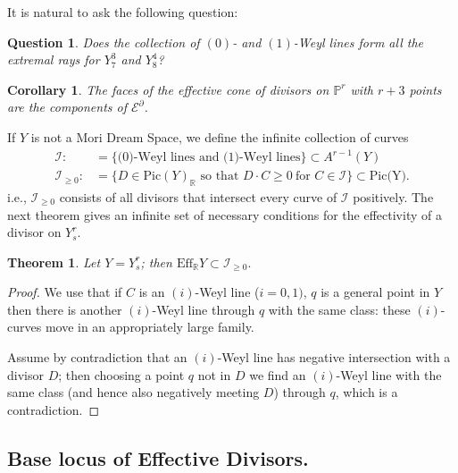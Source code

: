 \documentclass[12pt]{article}
\newtheorem{theorem}[equation]{Theorem}
\newtheorem{corollary}[equation]{Corollary}
\newtheorem{question}[equation]{Question}
\numberwithin{equation}{section}
\numberwithin{subeq}{equation}
\def\bbR{\mathbb{R}}
\begin{document}
It is natural to ask the following question:
\begin{question}\label{nms3}
Does the collection of $(0)$- and $(1)$-Weyl lines form all the extremal rays for $Y^3_7$ and $Y^4_8$?
\end{question}

\begin{corollary}
The faces of the effective cone of divisors on $\mathbb{P}^r$ with $r+3$ points are the components of $\mathcal{E}^{\partial}$.
\end{corollary}


If $Y$ is not a Mori Dream Space,
we define the infinite collection of curves
\begin{equation}
\begin{split}
\mathcal{I}:&=\{\text{(0)-Weyl lines and (1)-Weyl lines} \} \subset A^{r-1}(Y)\\
\mathcal{I}_{\geq 0}:&=\{D\in \text{Pic}(Y)_{\bbR} \text{ so that } D \cdot C\geq 0\ \text{for } C\in \mathcal{I}\} \subset \text{Pic(Y)}.
\end{split}
\end{equation}
i.e., $\mathcal{I}_{\geq 0}$ consists of
all divisors that intersect every curve of $\mathcal{I}$ positively.
The next theorem gives an infinite set of necessary conditions for the effectivity of a divisor on $Y^r_s$.

\begin{theorem}\label{nms} Let $Y=Y^r_{s}$; then
 $ \text{Eff}_{\mathbb{R}} Y \subset \mathcal{I}_{\geq 0}.$
\end{theorem}

\begin{proof}
We use that if $C$ is an $(i)$-Weyl line ($i=0,1)$, $q$ is a general point in $Y$
then there is another $(i)$-Weyl line through $q$ with the same class: these $(i)$-curves move in an appropriately large family.

Assume by contradiction that an $(i)$-Weyl line has negative intersection with a divisor $D$;
then choosing a point $q$ not in $D$
we find an $(i)$-Weyl line with the same class (and hence also negatively meeting $D$)
through $q$, which is a contradiction.
\end{proof}

\subsection{Base locus of Effective Divisors.}\label{baselocus}
\end{document}
